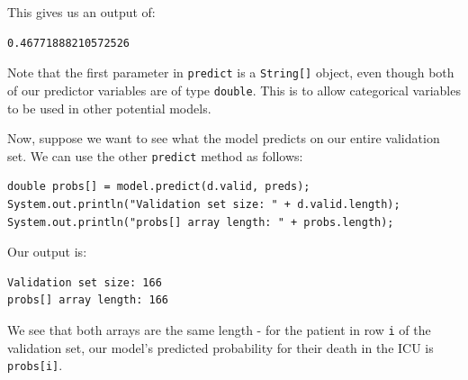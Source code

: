 \documentclass{article}
\begin{document}
This gives us an output of:
\begin{lstlisting}
0.46771888210572526
\end{lstlisting}

Note that the first parameter in \verb|predict| is a \verb|String[]| object, even though both of our predictor variables are of type \verb|double|. This is to allow categorical variables to be used in other potential models. 

Now, suppose we want to see what the model predicts on our entire validation set. We can use the other \verb|predict| method as follows:

\begin{lstlisting}
double probs[] = model.predict(d.valid, preds);
System.out.println("Validation set size: " + d.valid.length);
System.out.println("probs[] array length: " + probs.length);
\end{lstlisting}

Our output is:
\begin{lstlisting}
Validation set size: 166
probs[] array length: 166
\end{lstlisting}

We see that both arrays are the same length - for the patient in row \verb|i| of the validation set, our model's predicted probability for their death in the ICU is \verb|probs[i]|. 
\end{document}
